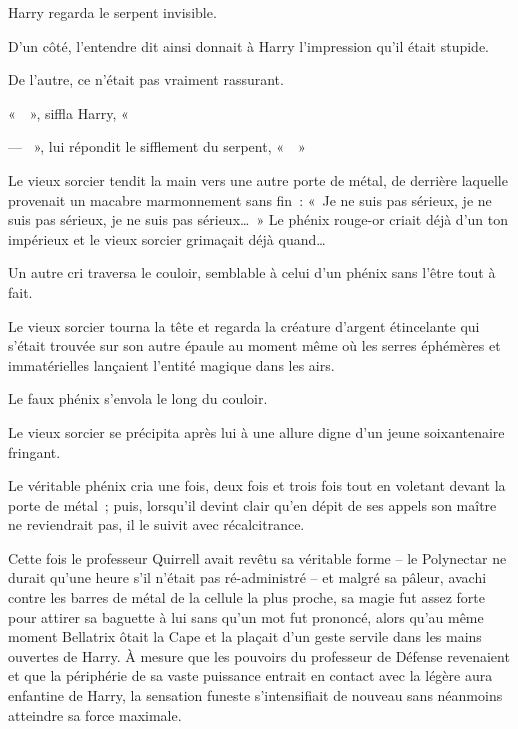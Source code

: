 Harry regarda le serpent invisible.

D'un côté, l'entendre dit ainsi donnait à Harry l'impression qu'il était stupide.

De l'autre, ce n'était pas vraiment rassurant.

«~~», siffla Harry, «~

--- ~», lui répondit le sifflement du serpent, «~~»

\later

Le vieux sorcier tendit la main vers une autre porte de métal, de derrière laquelle provenait un macabre marmonnement sans fin~: «~Je ne suis pas sérieux, je ne suis pas sérieux, je ne suis pas sérieux…~»
Le phénix rouge-or criait déjà d'un ton impérieux et le vieux sorcier grimaçait déjà quand…

Un autre cri traversa le couloir, semblable à celui d'un phénix sans l'être tout à fait.

Le vieux sorcier tourna la tête et regarda la créature d'argent étincelante qui s'était trouvée sur son autre épaule au moment même où les serres éphémères et immatérielles lançaient l'entité magique dans les airs.

Le faux phénix s'envola le long du couloir.

Le vieux sorcier se précipita après lui à une allure digne d'un jeune soixantenaire fringant.

Le véritable phénix cria une fois, deux fois et trois fois tout en voletant devant la porte de métal~; puis, lorsqu'il devint clair qu'en dépit de ses appels son maître ne reviendrait pas, il le suivit avec récalcitrance.

\later

Cette fois le professeur Quirrell avait revêtu sa véritable forme -- le Polynectar ne durait qu'une heure s'il n'était pas ré-administré -- et malgré sa pâleur, avachi contre les barres de métal de la cellule la plus proche, sa magie fut assez forte pour attirer sa baguette à lui sans qu'un mot fut prononcé, alors qu'au même moment Bellatrix ôtait la Cape et la plaçait d'un geste servile dans les mains ouvertes de Harry.
À mesure que les pouvoirs du professeur de Défense revenaient et que la périphérie de sa vaste puissance entrait en contact avec la légère aura enfantine de Harry, la sensation funeste s'intensifiait de nouveau sans néanmoins atteindre sa force maximale.

